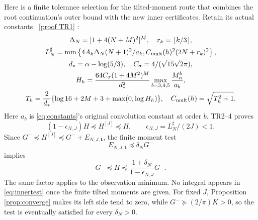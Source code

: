 \documentclass[11pt]{article}
\begin{document}
Here is a finite tolerance selection for the tilted-moment route that
combines the root continuation's outer bound with the new inner
certificates.  Retain its actual constants \cite{TR}%
~\href{https://github.com/KokunoYumeto/zeta-function-research-reader/blob/5992ad50c0f2a06921f1fcaded7b4e38097c0739/workbenches/splitzero-tandem/continuations/20260920-original-kernel-mixed-determinants/providers/NATIVE_TRUNCATION_CONDUCTOR_RETURN.tex\#L54}{[proof TR1]}%
{}:
\begin{equation}\label{eq:Lsharp}
 \begin{gathered}
 \Delta_N=[1+4(N+M)^2]^M,\quad r_k=\lfloor k/3\rfloor,\\
 L_N^\sharp=\min\left\{4A_k\Delta_N(N+1)^2/a_k,
                  C_{\rm mult}(h)^2(2N+r_k)^2\right\},\\
 d_*=\alpha-\log(5/3),\quad C_\sigma=4/(\sqrt{15}\sqrt{2\pi}),\\
 H_h=\frac{64C_\sigma(1+4M^2)^M}{d_*^2}
                   \max_{b=3,4,5}\frac{M_\alpha^b}{a_b},\\
 T_h=\frac2{d_*}\{\log16+2M+3+\max(0,\log H_h)\},
 \quad C_{\rm mult}(h)=\sqrt{T_h^2+1}.
 \end{gathered}
\end{equation}
Here $a_b$ is \eqref{eq:constants}'s original convolution constant
at order $b$.  TR2--4 proves
\begin{equation}\label{eq:outerrelative}
 (1-\epsilon_{N,J})H\preceq H^{[J]}\preceq H,
 \qquad\epsilon_{N,J}=L_N^\sharp/(2J)<1.
\end{equation}
Since $G^-\preceq H^{[J]}\preceq G^-+E_{N,J,\mathbf t}$,
the finite moment test
\begin{equation}\label{eq:innertest}
 E_{N,J,\mathbf t}\preceq\delta_NG^-
\end{equation}
implies
\begin{equation}\label{eq:jointrelative}
 G^-\preceq H\preceq
 \frac{1+\delta_N}{1-\epsilon_{N,J}}G^-.
\end{equation}
The same factor applies to the observation minimum.  No integral
appears in \eqref{eq:innertest} once the finite tilted moments are
given.  For fixed $J$, Proposition \ref{prop:converge} makes its left
side tend to zero, while $G^-\succeq(2/\pi)K>0$, so the test is
eventually satisfied for every $\delta_N>0$.
\end{document}
